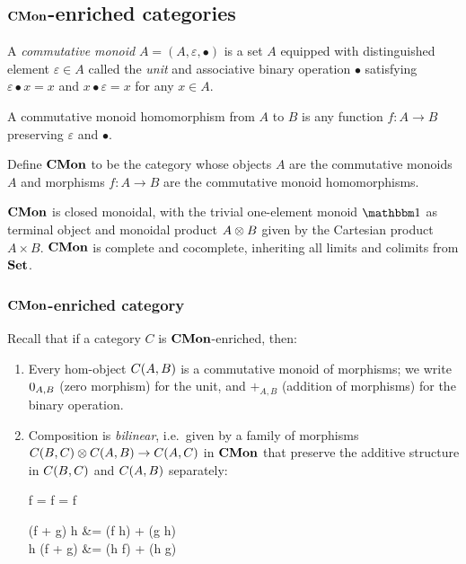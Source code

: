 \subsection{$\mathbf{CMon}$-enriched categories}
\label{sec:cmon-enriched}

\begin{definition}
A \emph{commutative monoid} $A = (A, \varepsilon, \bullet)$ is a set $A$ equipped with distinguished element
$\varepsilon \in A$ called the \emph{unit} and associative binary operation $\bullet$ satisfying $\varepsilon
\bullet x = x$ and $x \bullet \varepsilon = x$ for any $x \in A$.
\end{definition}

A commutative monoid homomorphism from $A$ to $B$ is any function $f: A \to B$ preserving $\varepsilon$ and
$\bullet$.

\begin{definition}
Define $\mathbf{CMon}$ to be the category whose objects $A$ are the commutative monoids $A$ and morphisms $f: A \to B$
are the commutative monoid homomorphisms.
\end{definition}

$\mathbf{CMon}$ is closed monoidal, with the trivial one-element monoid $\One$ as terminal object and monoidal product
$A \otimes B$ given by the Cartesian product $A \times B$. $\mathbf{CMon}$ is complete and cocomplete, inheriting all
limits and colimits from $\mathbf{Set}$.

\subsubsection{$\mathbf{CMon}$-enriched category}

Recall that if a category $C$ is $\mathbf{CMon}$-enriched, then:
\begin{enumerate}
\item Every hom-object ${C}(A,B)$ is a commutative monoid of morphisms; we write $0_{A,B}$ (zero
morphism) for the unit, and $+_{A,B}$ (addition of morphisms) for the binary operation.
\item Composition is \emph{bilinear}, i.e.~given by a family of morphisms ${C}(B,C) \otimes
{C}(A,B) \to {C}(A,C)$ in $\mathbf{CMon}$ that preserve the additive structure in ${C}(B,C)$ and
${C}(A,B)$ separately:

\begin{salign*}
f \comp \zero = f = \zero \comp f
\end{salign*}
\begin{salign*}
(f + g) \comp h &= (f \comp h) + (g \comp h) \\
h \comp (f + g) &= (h \comp f) + (h \comp g)
\end{salign*}
\end{enumerate}

